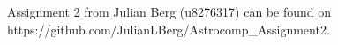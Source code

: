 Assignment 2 from Julian Berg (u8276317) can be found on https://github.com/JulianLBerg/Astrocomp_Assignment2.